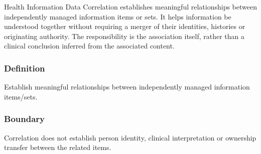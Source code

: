 Health Information Data Correlation establishes meaningful relationships between independently managed information items or sets. It helps information be understood together without requiring a merger of their identities, histories or originating authority. The responsibility is the association itself, rather than a clinical conclusion inferred from the associated content.

\subsubsection*{Definition}

Establish meaningful relationships between independently managed information items/\allowbreak{}sets.

\subsubsection*{Boundary}

Correlation does not establish person identity, clinical interpretation or ownership transfer between the related items.

